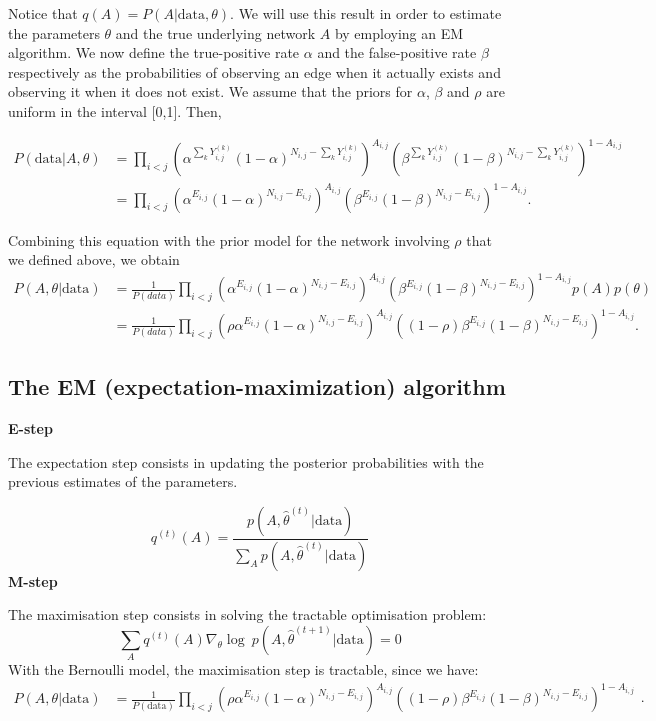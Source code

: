 \documentclass[]{article}
\begin{document}
Notice that \(q(A)=P(A|\mbox{data}, \theta)\). We will use this result
in order to estimate the parameters \(\theta\) and the true underlying
network \(A\) by employing an EM algorithm. We now define the
true-positive rate \(\alpha\) and the false-positive rate \(\beta\)
respectively as the probabilities of observing an edge when it actually
exists and observing it when it does not exist. We assume that the
priors for \(\alpha\), \(\beta\) and \(\rho\) are uniform in the
interval {[}0,1{]}. Then,

\[\begin{aligned}
P(\mbox{data}|A, \theta)
&=\prod_{i<j}\left(\alpha^{\sum_{k}Y_{i,j}^{(k)}}(1-\alpha)^{N_{i,j}-\sum_kY_{i,j}^{(k)}}\right)^{A_{i,j}}\left(\beta^{\sum_kY_{i,j}^{(k)}}(1-\beta)^{N_{i,j}-\sum_kY_{i,j}^{(k)}}\right)^{1-A_{i,j}} \\
&=\prod_{i<j}\left(\alpha^{E_{i,j}}(1-\alpha)^{N_{i,j}-E_{i,j}}\right)^{A_{i,j}}\left(\beta^{E_{i,j}}(1-\beta)^{N_{i,j}-E_{i,j}}\right)^{1-A_{i,j}}.
\end{aligned}\]

Combining this equation with the prior model for the network involving
\(\rho\) that we defined above, we obtain \[\begin{aligned}
P(A,\theta|\mbox{data})
&=\frac{1}{P(data)}\prod_{i<j}\left(\alpha^{E_{i,j}}(1-\alpha)^{N_{i,j}-E_{i,j}}\right)^{A_{i,j}}\left(\beta^{E_{i,j}}(1-\beta)^{N_{i,j}-E_{i,j}}\right)^{1-A_{i,j}} p(A)p(\theta) \\
&=\frac{1}{P(data)}\prod_{i<j}\left(\rho \alpha^{E_{i,j}}(1-\alpha)^{N_{i,j}-E_{i,j}}\right)^{A_{i,j}}\left((1-\rho)\beta^{E_{i,j}}(1-\beta)^{N_{i,j}-E_{i,j}}\right)^{1-A_{i,j}}.
\end{aligned}\]

\hypertarget{the-em-expectation-maximization-algorithm}{%
\subsection{The EM (expectation-maximization)
algorithm}\label{the-em-expectation-maximization-algorithm}}

\textbf{E-step}

The expectation step consists in updating the posterior probabilities
with the previous estimates of the parameters.

\[q^{(t)}(A)=\frac{p(A,\hat{\theta}^{(t)}|\mbox{data})}{\sum_A{p(A,\hat{\theta}^{(t)}|\mbox{data})}}\]
\textbf{M-step}

The maximisation step consists in solving the tractable optimisation
problem:
\[\sum_Aq^{(t)}(A)\nabla_\theta \log~{p(A,\hat{\theta}^{(t+1)}|\mbox{data})}=0\]
With the Bernoulli model, the maximisation step is tractable, since we
have:
\[\begin{split}P(A,\theta|\mbox{data})&=\frac{1}{P(\mbox{data})}\prod_{i<j}\left(\rho \alpha^{E_{i,j}}(1-\alpha)^{N_{i,j}-E_{i,j}}\right)^{A_{i,j}}\left((1-\rho)\beta^{E_{i,j}}(1-\beta)^{N_{i,j}-E_{i,j}}\right)^{1-A_{i,j}}\end{split}.\]
\end{document}
